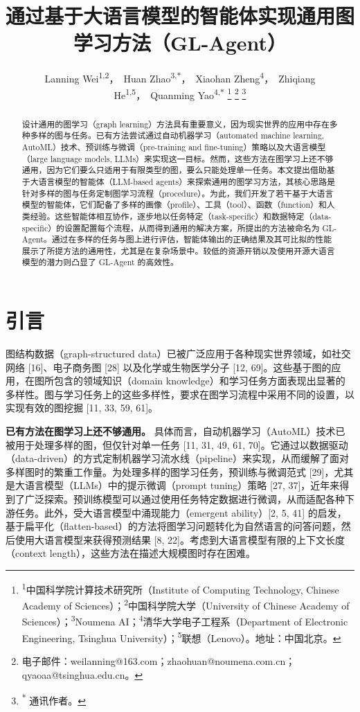 \documentclass[11pt,UTF8,fontset=fandol]{ctexart}
\title{\textbf{通过基于大语言模型的智能体实现通用图学习方法（GL-Agent）}}
\author{Lanning Wei\textsuperscript{1,2}，~Huan Zhao\textsuperscript{3,$*$}，~Xiaohan Zheng\textsuperscript{4}，~Zhiqiang He\textsuperscript{1,5}，~Quanming Yao\textsuperscript{4,$*$}%
\thanks{\textsuperscript{1}中国科学院计算技术研究所（Institute of Computing Technology, Chinese Academy of Sciences）；\textsuperscript{2}中国科学院大学（University of Chinese Academy of Sciences）；\textsuperscript{3}Noumena AI；\textsuperscript{4}清华大学电子工程系（Department of Electronic Engineering, Tsinghua University）；\textsuperscript{5}联想（Lenovo）。地址：中国北京。}%
\thanks{电子邮件：weilanning@163.com；zhaohuan@noumena.com.cn；qyaoaa@tsinghua.edu.cn。}%
\thanks{\textsuperscript{$*$} 通讯作者。}%
}
\date{}
\begin{document}
\maketitle

\begin{abstract}
设计通用的图学习（graph learning）方法具有重要意义，因为现实世界的应用中存在多种多样的图与任务。已有方法尝试通过自动机器学习（automated machine learning, AutoML）技术、预训练与微调（pre-training and fine-tuning）策略以及大语言模型（large language models, LLMs）来实现这一目标。然而，这些方法在图学习上还不够通用，因为它们要么只适用于有限类型的图，要么只能处理单一任务。本文提出借助基于大语言模型的智能体（LLM-based agents）来探索通用的图学习方法，其核心思路是针对多样的图与任务定制图学习流程（procedure）。为此，我们开发了若干基于大语言模型的智能体，它们配备了多样的画像（profile）、工具（tool）、函数（function）和人类经验。这些智能体相互协作，逐步地以任务特定（task-specific）和数据特定（data-specific）的设置配置每个流程，从而得到通用的解决方案，所提出的方法被命名为 GL-Agent。通过在多样的任务与图上进行评估，智能体输出的正确结果及其可比拟的性能展示了所提方法的通用性，尤其是在复杂场景中。较低的资源开销以及使用开源大语言模型的潜力则凸显了 GL-Agent 的高效性。
\end{abstract}

\section{引言}

图结构数据（graph-structured data）已被广泛应用于各种现实世界领域，如社交网络 [16]、电子商务图 [28] 以及化学或生物医学分子 [12, 69]。这些基于图的应用，在图所包含的领域知识（domain knowledge）和学习任务方面表现出显著的多样性。图与学习任务上的这些多样性，要求在图学习流程中采用不同的设置，以实现有效的图挖掘 [11, 33, 59, 61]。

\textbf{已有方法在图学习上还不够通用。} 具体而言，自动机器学习（AutoML）技术已被用于处理多样的图，但仅针对单一任务 [11, 31, 49, 61, 70]。它通过以数据驱动（data-driven）的方式定制机器学习流水线（pipeline）来实现，从而缓解了面对多样图时的繁重工作量。为处理多样的图学习任务，预训练与微调范式 [29]，尤其是大语言模型（LLMs）中的提示微调（prompt tuning）策略 [27, 37]，近年来得到了广泛探索。预训练模型可以通过使用任务特定数据进行微调，从而适配各种下游任务。此外，受大语言模型中涌现能力（emergent ability）[2, 5, 41] 的启发，基于扁平化（flatten-based）的方法将图学习问题转化为自然语言的问答问题，然后使用大语言模型来获得预测结果 [8, 22]。考虑到大语言模型有限的上下文长度（context length），这些方法在描述大规模图时存在困难。
\end{document}
